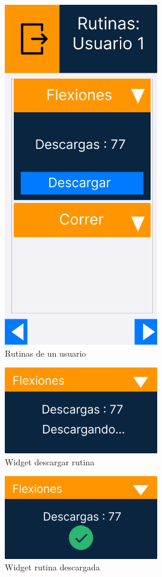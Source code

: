 \begin{figure}[H]
   \centering
    \includegraphics[width=0.6\textwidth]{fotos/Frame 56.png}
    \caption{Rutinas de un usuario}
    \label{fig:Rutinas de un usuario}
\end{figure}
\begin{figure}[H]
   \centering
    \includegraphics[width=0.6\textwidth]{fotos/Frame 57.png}
    \caption{Widget descargar rutina}
    \label{fig:Widget descargar rutina}
\end{figure}
\begin{figure}[H]
   \centering
    \includegraphics[width=0.6\textwidth]{fotos/Frame 58.png}
    \caption{Widget rutina descargada}
    \label{fig:Widget rutina descargada}
\end{figure}

